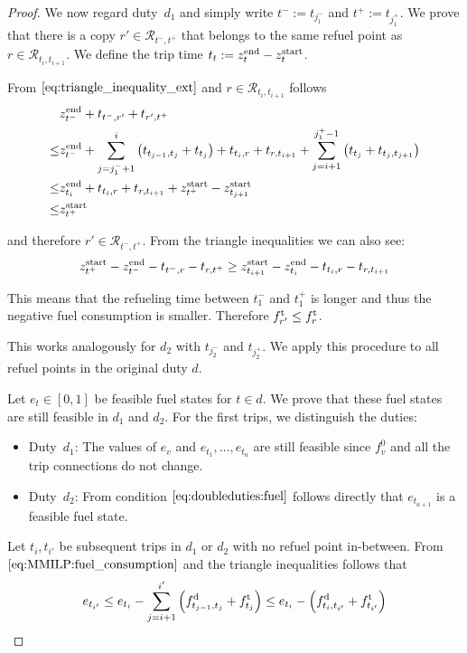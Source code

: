 \begin{proof}
We now regard duty~$d_1$ and simply write ${t^-:=t_{j^-_1}}$ and ${t^+:=t_{j^+_1}}$. We prove that there is a copy ${r'\in\mathcal{R}_{t^-,t^+}}$ that belongs to the same refuel point as ${r\in\mathcal{R}_{t_i,t_{i+1}}}$. We define the trip time ${t_t := z^{\operatorname{end}}_{t} - z^{\operatorname{start}}_{t}}$.

From $\eqref{eq:triangle_inequality_ext}$ and ${r\in\mathcal{R}_{t_i,t_{i+1}}}$ follows
\begin{align*}
	& z^{\operatorname{end}}_{t^-} + t_{t^-,r'} + t_{r',t^+} \\
	\leq & z^{\operatorname{end}}_{t^-} + \sum_{j=j^-_1+1}^i \left(t_{t_{j-1},t_{j}} + t_{t_j}\right) + t_{t_i,r} + t_{r,t_{i+1}} + \sum_{j=i+1}^{j^+_1-1} \left(t_{t_j} + t_{t_{j},t_{j+1}}\right) \\
	\leq & z^{\operatorname{end}}_{t_i} + t_{t_i,r} + t_{r,t_{i+1}} + z^{\operatorname{start}}_{t^+} - z^{\operatorname{start}}_{t_{j+1}} \\
	\leq & z^{\operatorname{start}}_{t^+}
\end{align*}

and therefore ${r'\in\mathcal{R}_{t^-,t^+}}$. From the triangle inequalities we can also see:
\begin{align*}
	z^{\operatorname{start}}_{t^+} - z^{\operatorname{end}}_{t^-} - t_{t^-,r} - t_{r,t^+} \geq z^{\operatorname{start}}_{t_{i+1}} - z^{\operatorname{end}}_{t_i} - t_{t_i,r} - t_{r,t_{i+1}}
\end{align*}

This means that the refueling time between $t^-_1$ and $t^+_1$ is longer and thus the negative fuel consumption is smaller. Therefore ${f^{\operatorname{t}}_{r'}\leq f^{\operatorname{t}}_{r}}$.

This works analogously for $d_2$ with $t_{j^-_2}$ and $t_{j^+_2}$. We apply this procedure to all refuel points in the original duty $d$.

Let $e_t\in[0,1]$ be feasible fuel states for ${t\in d}$. We prove that these fuel states are still feasible in $d_1$ and $d_2$. For the first trips, we distinguish the duties:
\begin{itemize}
	\item{Duty~$d_1$:}
		The values of $e_v$ and ${e_{t_1},\dots,e_{t_a}}$ are still feasible since $f^0_v$ and all the trip connections do not change.
	\item{Duty~$d_2$:}
		From condition $\eqref{eq:doubleduties:fuel}$ follows directly that $e_{t_{a+1}}$ is a feasible fuel state.
\end{itemize}

Let $t_i,t_{i'}$ be subsequent trips in $d_1$ or $d_2$ with no refuel point in-between. From $\eqref{eq:MMILP:fuel_consumption}$ and the triangle inequalities follows that
\begin{align*}
	e_{t_{i'}} \leq e_{t_i} - \sum_{j=i+1}^{i'} \left(f^{\operatorname{d}}_{t_{j-1},t_j}+f^{\operatorname{t}}_{t_j}\right) \leq e_{t_i} - \left(f^{\operatorname{d}}_{t_i,t_{i'}} + f^{\operatorname{t}}_{t_{i'}}\right)
\end{align*}


\end{proof}
